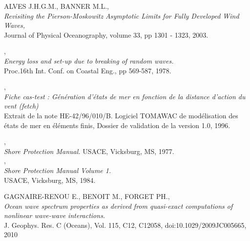 
\pagebreak


\begin{thebibliography}{99}


 {\sc ALVES J.H.G.M., BANNER M.L.},\\ 
{\em  Revisiting the Pierson-Moskowitz Asymptotic Limits for Fully Developed Wind Waves,}\\
Journal of Physical Oceanography, volume 33, pp 1301 - 1323, 2003.

,\\ 
{\em Energy loss and set-up due to breaking of random waves. }\\
Proc.16th Int. Conf. on Coastal Eng., pp 569-587, 1978.

,\\ 
{\em  Fiche cas-test : G\'en\'eration d'\'etats de mer en fonction de la distance d'action du vent (fetch) }\\
Extrait de la note HE-42/96/010/B. Logiciel TOMAWAC de mod\'elisation des \'etats de mer en \'el\'ements finis, Dossier de validation de la version 1.0, 1996.  


,\\  
{\em Shore Protection Manual. }
USACE, Vicksburg, MS, 1977.\\

,\\  
{\em Shore Protection Manual Volume 1. }\\
USACE, Vicksburg, MS, 1984.


 {\sc GAGNAIRE-RENOU E., BENOIT M., FORGET PH.},\\  
{\em Ocean wave spectrum properties as derived from quasi-exact computations of nonlinear wave-wave interactions. }\\
J. Geophys. Res. C (Oceans), Vol. 115, C12, C12058, doi:10.1029/2009JC005665, 2010


\end{thebibliography}
